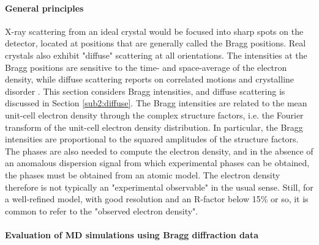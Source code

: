 \documentclass[9pt,review]{livecoms}
\begin{document}
\paragraph{General principles}

X-ray scattering from an ideal crystal would be focused into sharp spots on the detector, located at positions that are generally called the Bragg positions.
Real crystals also exhibit "diffuse" scattering at all orientations.
The intensities at the Bragg positions are sensitive to the time- and space-average of the electron density, while diffuse scattering reports on correlated motions and crystalline disorder \cite{meisburger_x-ray_2017}.
This section considers Bragg intensities, and diffuse scattering is discussed in Section \ref{sub2:diffuse}.
The Bragg intensities are related to the mean unit-cell electron density through the complex structure factors, i.e. the Fourier transform of the unit-cell electron density distribution.
In particular, the Bragg intensities are proportional to the squared amplitudes of the structure factors.
The phases are also needed to compute the electron density, and in the absence of an anomalous dispersion signal from which experimental phases can be obtained, the phases must be obtained from an atomic model.
The electron density therefore is not typically an "experimental observable" in the usual sense.
Still, for a well-refined model, with good resolution and an R-factor below 15\% or so, it is common to refer to the "observed electron density".

\paragraph{Evaluation of MD simulations using Bragg diffraction data}
\end{document}
